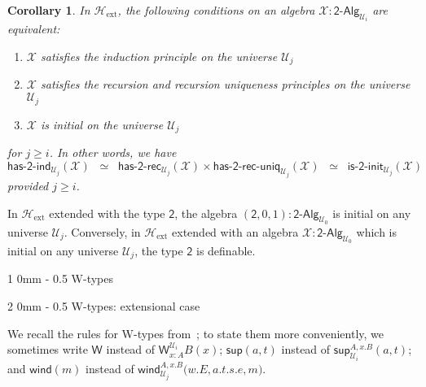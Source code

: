 \documentclass[reqno,10pt,a4paper,oneside]{amsart}
\makeatletter
\newcommand{\X}{\mathcal{X}}
\newcommand{\W}{\mathsf{W}}
\newcommand{\wsup}{\mathsf{sup}}
\newcommand{\wind}{\mathsf{wind}}
\newcommand{\Bool}{\mathsf{2}}
\newcommand{\UU}{\mathcal{U}}
\newcommand{\BoolAlg}{\mathsf{2}\text{-}\mathsf{Alg}}
\newcommand{\HasBoolRec}{\mathsf{has}\text{-}\mathsf{2}\text{-}\mathsf{rec}}
\newcommand{\HasBoolInd}{\mathsf{has}\text{-}\mathsf{2}\text{-}\mathsf{ind}}
\newcommand{\HasBoolRecUniq}{\mathsf{has}\text{-}\mathsf{2}\text{-}\mathsf{rec}\text{-}\mathsf{uniq}}
\newcommand{\IsBoolInit}{\mathsf{is}\text{-}\mathsf{2}\text{-}\mathsf{init}}
\newcommand{\Hext}{\mathcal{H}_{\mathrm{ext}}}
\renewcommand{\section}{\@startsection
  {section}%
   {1}%
  {0mm}%
   {-\baselineskip}%
  {0.5\baselineskip}%
   {\Large\bfseries}}%
\renewcommand{\subsection}{\@startsection
  {subsection}%
  {2}%
  {0mm}%
  {-\baselineskip}%
  {0.5\baselineskip}%
  {\normalfont\normalsize\bf}}%
\numberwithin{equation}{section}
\theoremstyle{mythm}
\newtheorem{corollary}[theorem]{Corollary}
\theoremstyle{mydef}
\theoremstyle{myrmk}
\makeatother
\begin{document}
\begin{corollary} \label{lem:BoolMain}
In $\Hext$, the following conditions on an algebra $\X : \BoolAlg_{\UU_i}$ are equivalent:
\begin{enumerate}
\item $\mathcal{X}$ satisfies the induction principle on the universe $\UU_j$
\item $\mathcal{X}$ satisfies the recursion and recursion uniqueness principles on the universe $\UU_j$
\item $\mathcal{X}$ is initial on the universe $\UU_j$  
\end{enumerate}
for $j \geq i$. In other words, we have \[ \HasBoolInd_{\UU_j}(\X)  \;\; \simeq \;\; \HasBoolRec_{\UU_j}(\X) \times \HasBoolRecUniq_{\UU_j}(\X) \;\; \simeq \;\; \IsBoolInit_{\UU_j}(\X) \]
provided $j \geq i$. 
\end{corollary}



In $\Hext$ extended with the type $\Bool$, the algebra $(\Bool,0,1) : \BoolAlg_{\UU_0}$ is initial on any universe $\UU_j$. Conversely,  in $\Hext$ extended with an algebra $\X : \BoolAlg_{\UU_0}$ which is initial on any universe $\UU_j$, the type $\Bool$ is definable. 



\newpage

\section{W-types}
\label{section:wfiles}

\subsection{W-types: extensional case}

We recall the rules for W-types from~\cite{MartinLofP:inttt}; to state them more conveniently, we sometimes write $\W$ instead of $\W^{\UU_i}_{x : A}B(x)$; $\wsup(a,t)$ instead of $\wsup^{A,x.B}_{\UU_i}(a,t)$; and $\wind(m)$ instead of $\wind^{A,x.B}_{\UU_j}\big(w.E,a.t.s.e,m\big)$.

\smallskip
\end{document}
